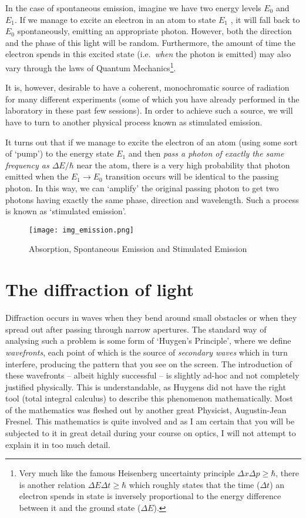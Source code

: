 In the case of spontaneous emission, imagine we have two energy levels $E_0$ and $E_1$. If we manage to excite an electron in an atom to state $E_1$ , it will fall back to $E_0$ spontaneously, emitting an appropriate photon. However, both the direction and the phase of this light will be random. Furthermore, the amount of time the electron spends in this excited state (i.e.\ \textit{when} the photon is emitted) may also vary through the laws of Quantum Mechanics\footnote{Very much like the famous Heisenberg uncertainty principle $\Delta x \Delta p \geq \hbar$, there is another relation $\Delta E \Delta t \geq \hbar$ which roughly states that the time ($\Delta t$) an electron spends in state is inversely proportional to the energy difference between it and the ground state ($\Delta E$).}.

It is, however, desirable to have a coherent, monochromatic source of radiation for many different experiments (some of which you have already performed in the laboratory in these past few sessions). In order to achieve such a source, we will have to turn to another physical process known as stimulated emission.

It turns out that if we manage to excite the electron of an atom (using some sort of `pump') to the energy state $E_1$ and then \textit{pass a photon of exactly the same frequency as $\Delta E/\hbar$} near the atom, there is a very high probability that photon emitted when the $E_1 \rightarrow E_0$ transition occurs will be identical to the passing photon. In this way, we can `amplify' the original passing photon to get two photons having exactly the same phase, direction and wavelength. Such a process is known as `stimulated emission'. 

\begin{figure}[!htb]
\centering
\texttt{[image: img\_emission.png]}
\caption{Absorption, Spontaneous Emission and Stimulated Emission}
\label{img_emission}
\end{figure}

\section{The diffraction of light}

Diffraction occurs in waves when they bend around small obstacles or when they spread out after passing through narrow apertures. The standard way of analysing such a problem is some form of `Huygen's Principle', where we define \textit{wavefronts}, each point of which is the source of \textit{secondary waves} which in turn interfere, producing the pattern that you see on the screen. The introduction of these wavefronts -- albeit highly successful -- is slightly ad-hoc and not completely justified physically. This is understandable, as Huygens did not have the right tool (total integral calculus) to describe this phenomenon mathematically. Most of the mathematics was fleshed out by another great Physicist, Augustin-Jean Fresnel. This mathematics is quite involved and as I am certain that you will be subjected to it in great detail during your course on optics, I will not attempt to explain it in too much detail. 

